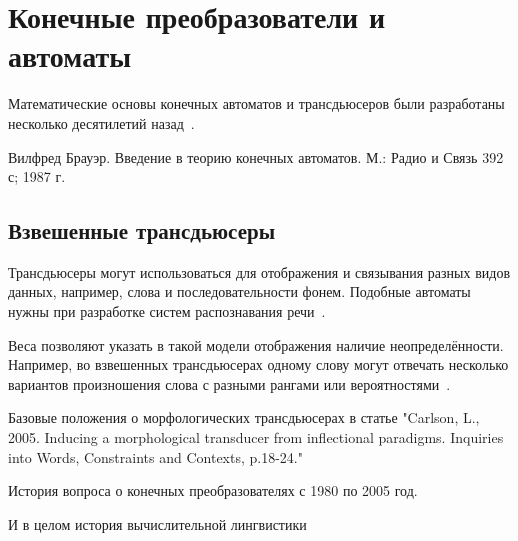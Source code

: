 \section{Конечные преобразователи и автоматы} \label{sect_review_automaton}

Математические основы конечных автоматов и трансдьюсеров были разработаны 
несколько десятилетий назад~\cite{MohriChapter4Lothaire2005applied}.


Вилфред Брауэр. Введение в теорию конечных автоматов. М.: Радио и Связь 392 с; 
1987 г. 



\subsection{Взвешенные трансдьюсеры} \label{sect_weighted_transducers}

Трансдьюсеры могут использоваться для отображения и связывания разных видов данных, 
например, слова и последовательности фонем. 
Подобные автоматы нужны при разработке систем распознавания речи~\cite[с.~200]{MohriChapter4Lothaire2005applied}.

Веса позволяют указать в такой модели отображения наличие неопределённости. 
Например, во взвешенных трансдьюсерах одному слову могут отвечать несколько вариантов 
произношения слова с разными рангами или вероятностями~\cite[с.~200]{MohriChapter4Lothaire2005applied}.


Базовые положения о морфологических трансдьюсерах в статье "Carlson, L., 2005. Inducing a morphological transducer from inflectional paradigms. Inquiries into Words, Constraints and Contexts, p.18-24."


История вопроса о конечных преобразователях с 1980 по 2005 год.

И в целом история вычислительной лингвистики 








